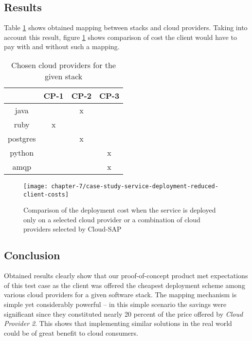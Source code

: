 \subsection*{Results}
Table \ref{tbl:test-service-deployment-cost-mapping} shows obtained mapping between stacks and cloud providers. Taking into account this result, figure \ref{ch7:service-deployment-cost} shows comparison of cost the client would have to pay with and without such a mapping.

\begin{table}
  \centering
  \begin{tabular}{ | c | c | c | c | }
    \hline                        
    & CP-1 & CP-2 & CP-3 \\
    \hline
    java      & & x & \\
    ruby      & x & & \\
    postgres  & & x & \\
    python    & & & x \\
    amqp      & & & x \\
    \hline  
  \end{tabular}
  \caption{Chosen cloud providers for the given stack}
  \label{tbl:test-service-deployment-cost-mapping}
\end{table}

\begin{figure}[!ht]
  \begin{center}
    \texttt{[image: chapter-7/case-study-service-deployment-reduced-client-costs]}
  \end{center}
  \caption{Comparison of the deployment cost when the service is deployed only on a selected cloud provider or a combination of cloud providers selected by Cloud-SAP}
  \label{ch7:service-deployment-cost}
\end{figure}

\subsection*{Conclusion}
Obtained results clearly show that our proof-of-concept product met expectations of this test case as the client was offered the cheapest deployment scheme among various cloud providers for a given software stack.
The mapping mechanism is simple yet considerably powerful -- in this simple scenario the savings were significant since they constituted nearly 20 percent of the price offered by \emph{Cloud Provider 2}. This shows that implementing similar solutions in the real world could be of great benefit to cloud consumers.

